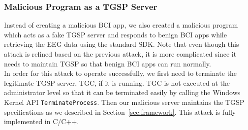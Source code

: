 \subsubsection{Malicious Program as a TGSP Server}
Instead of creating a malicious BCI app, we also created a malicious program which acts as a fake TGSP server and responds to benign BCI apps while retrieving the EEG data using the standard SDK. Note that even though this attack is refined based on the previous attack, it is more complicated since it needs to maintain TGSP so that benign BCI apps can run normally.\\
\indent In order for this attack to operate successfully, we first need to terminate the legitimate TGSP server, TGC, if it is running. TGC is not executed at the administrator level so that it can be terminated easily by calling the Windows Kernel API \texttt{TerminateProcess}. Then our malicious server maintains the TGSP specifications as we described in Section~\ref{sec:framework}. This attack is fully implemented in C/C++.

